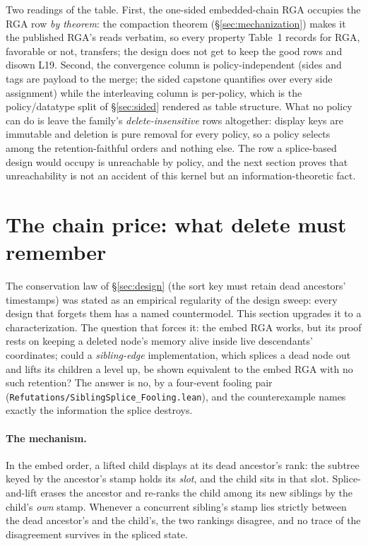 \documentclass[11pt]{article}
\newcommand{\lean}[1]{\texttt{#1}}
\begin{document}
\noindent Two readings of the table. First, the one-sided
embedded-chain RGA occupies the RGA row \emph{by theorem}: the
compaction theorem (\S\ref{sec:mechanization}) makes it the published
RGA's reads verbatim, so every property Table~1 records for RGA,
favorable or not, transfers; the design does not get to keep the good
rows and disown L19. Second, the convergence column is
policy-independent (sides and tags are payload to the merge; the sided
capstone quantifies over every side assignment) while the interleaving
column is per-policy, which is the policy/datatype split of
\S\ref{sec:sided} rendered as table structure. What no policy can do is
leave the family's \emph{delete-insensitive} rows altogether: display
keys are immutable and deletion is pure removal for every policy, so a
policy selects among the retention-faithful orders and nothing else.
The row a splice-based design would occupy is unreachable by policy,
and the next section proves that unreachability is not an accident of
this kernel but an information-theoretic fact.

\section{The chain price: what delete must remember}
\label{sec:chainprice}

The conservation law of \S\ref{sec:design} (the sort key must retain
dead ancestors' timestamps) was stated as an empirical regularity of
the design sweep: every design that forgets them has a named
countermodel. This section upgrades it to a characterization. The
question that forces it: the embed RGA works, but its
proof rests on keeping a deleted node's memory alive inside live
descendants' coordinates; could a \emph{sibling-edge} implementation,
which splices a dead node out and lifts its children a level up, be
shown equivalent to the embed RGA with no such retention? The answer is
no, by a four-event fooling pair
(\lean{Refutations/SiblingSplice\_Fooling.lean}), and the counterexample
names exactly the information the splice destroys.

\paragraph{The mechanism.} In the embed order, a lifted child displays
at its dead ancestor's rank: the subtree keyed by the ancestor's stamp
holds its \emph{slot}, and the child sits in that slot. Splice-and-lift
erases the ancestor and re-ranks the child among its new siblings by
the child's \emph{own} stamp. Whenever a concurrent sibling's stamp
lies strictly between the dead ancestor's and the child's, the two
rankings disagree, and no trace of the disagreement survives in the
spliced state.
\end{document}
